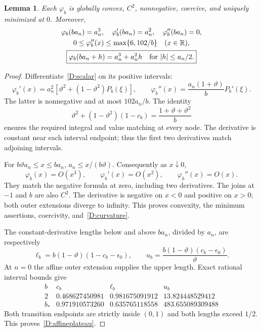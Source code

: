 \documentclass[10pt,oneside,openany]{book}
\newtheorem{lemma}{Lemma}[chapter]
\theoremstyle{remark}\newtheorem{remark}{Remark}[chapter]
\begin{document}
\begin{lemma}\label{D:scalarlemma}
Each $\varphi_b$ is globally convex, $C^2$, nonnegative, coercive, and uniquely minimized at $0$. Moreover,
\begin{gather}
 \varphi_b(ba_n)=a_n^3,\quad
 \varphi_b'(ba_n)=a_n^2,\quad\varphi_b''(ba_n)=0,\label{D:jets}\\
 0\le\varphi_b''(x)\le\max\{6,102/b\}\quad(x\in\mathbb R),\label{D:curvature}\\
 \boxed{\varphi_b(ba_n+h)=a_n^3+a_n^2h\quad\text{for }|h|\le a_n/2.}\label{D:affineplateau}
\end{gather}
\end{lemma}
\begin{proof}
Differentiate~\eqref{D:scalar} on its positive intervals:
\[
 \varphi_b'(x)=a_n^2[\vartheta^2+(1-\vartheta^2)P_b(\xi)],
 \qquad
 \varphi_b''(x)=\frac{a_n(1+\vartheta)}bP_b'(\xi).
\]
The latter is nonnegative and at most $102a_n/b$. The identity
\[
 \vartheta^2+(1-\vartheta^2)(1-c_b)
 =\frac{1+\vartheta+\vartheta^2}{b}
\]
ensures the required integral and value matching at every node. The derivative is constant near each interval endpoint; thus the first two derivatives match adjoining intervals.

For $b\vartheta a_n\le x\le ba_n$, $a_n\le x/(b\vartheta)$. Consequently as $x\downarrow0$,
\[
 \varphi_b(x)=O(x^3),\qquad\varphi_b'(x)=O(x^2),\qquad
 \varphi_b''(x)=O(x).
\]
They match the negative formula at zero, including two derivatives. The joins at $-1$ and $b$ are also $C^2$. The derivative is negative on $x<0$ and positive on $x>0$; both outer extensions diverge to infinity. This proves convexity, the minimum assertions, coercivity, and~\eqref{D:curvature}.

The constant-derivative lengths below and above $ba_n$, divided by $a_n$, are respectively
\[
 \ell_b=b(1-\vartheta)(1-c_b-\epsilon_0),\qquad
 u_b=\frac{b(1-\vartheta)(c_b-\epsilon_0)}{\vartheta}.
\]
At $n=0$ the affine outer extension supplies the upper length. Exact rational interval bounds give
\[
\begin{array}{c|ccc}
 b&c_b&\ell_b&u_b\\\hline
2&0.468627450981&0.981675091912&13.824448529412\\
b_*&0.971910573260&0.635765118558&483.655089309488
\end{array}
\]
Both transition endpoints are strictly inside $(0,1)$ and both lengths exceed $1/2$. This proves~\eqref{D:affineplateau}.
\end{proof}
\end{document}
